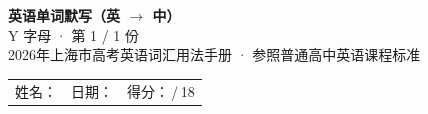 \documentclass[10pt,a4paper]{article}
\begin{document}
\pagestyle{plain}

\begin{center}
{\LARGE\bfseries 英语单词默写（英 $\to$ 中）}\\[0.22em]
{\large Y 字母 · 第 1 / 1 份}\\[0.18em]
{\small 2026年上海市高考英语词汇用法手册 · 参照普通高中英语课程标准}
\end{center}

\vspace{0.25em}
\noindent\begin{tabular}{@{}p{}@{}p{}@{}p{}@{}}
姓名：\underline{\hspace{2.0cm}} & 日期：\underline{\hspace{2.0cm}} & 得分：\underline{\hspace{1.3cm}}\,/\,18 \\
\end{tabular}

\vspace{0.3em}

\vspace{0.08em}
\end{document}
